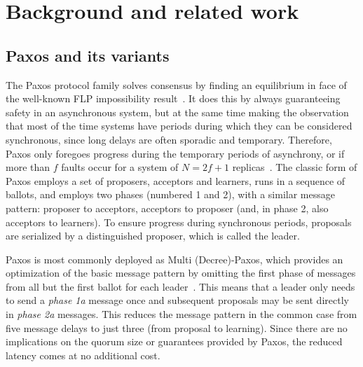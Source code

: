 \section{Background and related work}
\label{sec:related} 
\subsection{Paxos and its variants} \label{Paxos} 

The Paxos protocol family solves consensus by finding an equilibrium in face of the well-known FLP impossibility result~\cite{FLP85}. It does this by always guaranteeing safety in an asynchronous system, but at the same time making the observation that most of the time systems have periods during which they can be considered synchronous, since long delays are often sporadic and temporary. Therefore, Paxos only foregoes progress during the temporary periods of asynchrony, or if more than $f$ faults occur for a system of $N=2f+1$ replicas~\cite{L01}. The classic form of Paxos employs a set of proposers, acceptors and learners, runs in a sequence of ballots, and employs two phases (numbered 1 and 2), with a similar message pattern: proposer to acceptors, acceptors to proposer (and, in phase 2, also acceptors to learners). To ensure progress during synchronous periods, proposals are serialized by a distinguished proposer, which is called the leader.\par
Paxos is most commonly deployed as Multi (Decree)-Paxos, which provides an optimization of the basic message pattern by omitting the first phase of messages from all but the first ballot for each leader~\cite{Renesse2011}. This means that a leader only needs to send a \textit{phase 1a} message once and subsequent proposals may be sent directly in \textit{phase 2a} messages. This reduces the message pattern in the common case from five message delays to just three (from proposal to learning). Since there are no implications on the quorum size or guarantees provided by Paxos, the reduced latency comes at no additional cost. \par
